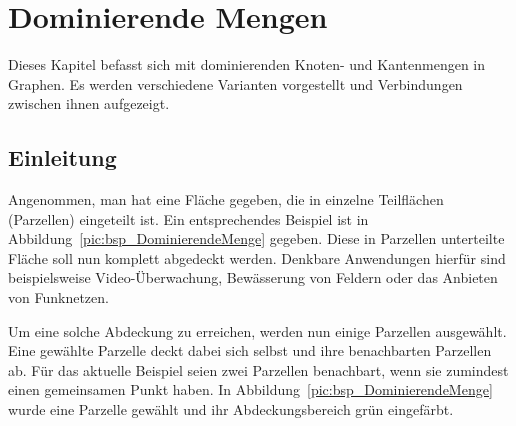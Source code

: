\chapter{Dominierende Mengen}


%
%

Dieses Kapitel befasst sich mit dominierenden Knoten- und Kantenmengen in Graphen. Es werden verschiedene Varianten vorgestellt und Verbindungen zwischen ihnen aufgezeigt. 
%
\section{Einleitung}

Angenommen, man hat eine Fläche gegeben, die in einzelne Teilflächen (Parzellen) eingeteilt ist. Ein entsprechendes Beispiel ist in Abbildung~\ref{pic:bsp_DominierendeMenge} gegeben. Diese in Parzellen unterteilte Fläche soll nun komplett abgedeckt werden. Denkbare Anwendungen hierfür sind beispielsweise Video-Überwachung, Bewässerung von Feldern oder das Anbieten von Funknetzen.

 Um eine solche Abdeckung zu erreichen, werden nun einige Parzellen ausgewählt. Eine gewählte Parzelle deckt dabei sich selbst und ihre benachbarten Parzellen ab. Für das aktuelle Beispiel seien zwei Parzellen benachbart, wenn sie zumindest einen gemeinsamen Punkt haben. In Abbildung~\ref{pic:bsp_DominierendeMenge} wurde eine Parzelle gewählt und ihr Abdeckungsbereich grün eingefärbt.

